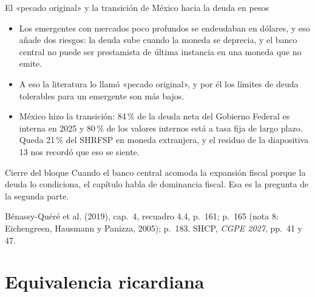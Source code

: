 \documentclass[aspectratio=169,11pt]{beamer}
\newcommand{\fuente}[1]{\par\vfill{\small\color{cGris}#1\par}}
\newcommand{\BQ}{Bénassy-Quéré et al. (2019), cap.~4}
\begin{document}
\begin{frame}{El «pecado original» y la transición de México hacia la deuda en pesos}
  \begin{itemize}
    \item Los emergentes con mercados poco profundos se endeudaban en dólares, y eso añade dos riesgos: la deuda sube cuando la moneda se deprecia, y el banco central no puede ser prestamista de última instancia en una moneda que no emite.
    \pause
    \item A eso la literatura lo llamó «pecado original», y por él los límites de deuda tolerables para un emergente son más bajos.
    \pause
    \item México hizo la transición: 84\,\% de la deuda neta del Gobierno Federal es interna en 2025 y 80\,\% de los valores internos está a tasa fija de largo plazo. Queda 21\,\% del SHRFSP en moneda extranjera, y el residuo de la diapositiva 13 nos recordó que eso se siente.
  \end{itemize}
  \pause
  \begin{block}{Cierre del bloque}
    Cuando el banco central acomoda la expansión fiscal porque la deuda lo condiciona, el capítulo habla de dominancia fiscal. Esa es la pregunta de la segunda parte.
  \end{block}
  \fuente{\BQ, recuadro 4.4, p.~161; p.~165 (nota 8: Eichengreen, Hausmann y Panizza, 2005); p.~183. SHCP, \emph{CGPE 2027}, pp.~41 y 47.}
\end{frame}

\section{Equivalencia ricardiana}
\end{document}

